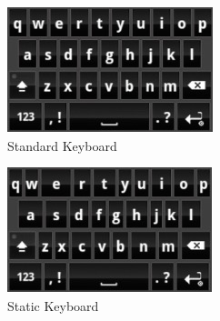 \documentclass{vgtc}                          %
\begin{document}
\begin{figure}[h!]
 \centering %
 \includegraphics[width=\columnwidth]{stand.jpg}
 \caption{Standard Keyboard}
 \label{fig:standard}
\end{figure}
\begin{figure}[h!]
 \centering %
 \includegraphics[width=\columnwidth]{static.jpg}
 \caption{Static Keyboard}
 \label{fig:static}
\end{figure}
\end{document}
